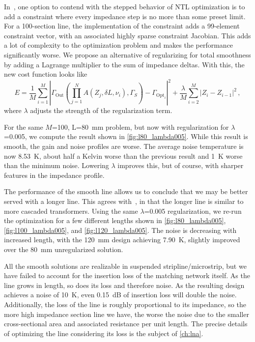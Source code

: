 In~\cite{miazgaNonuniformTransmissionLine2014}, one option to contend with the stepped behavior of NTL optimization is to add a constraint where every impedance step is no more than some preset limit.
For a \num{100}-section line, the implementation of the constraint adds a \num{99}-element constraint vector, with an associated highly sparse constraint Jacobian.
This adds a lot of complexity to the optimization problem and makes the performance significantly worse.
We propose an alternative of regularizing for total smoothness by adding a Lagrange multiplier to the sum of impedance deltas.
With this, the new cost function looks like
%
\begin{equation}
    E = \frac{1}{M}\sum_{i=1}^M \left| \Gamma_\text{Out}\left(\prod_{j=1}^N A(Z_j,\delta L, \nu_i),\Gamma_S\right) - \Gamma_{\text{Opt}_i} \right|^2 + \frac{\lambda}{M} \sum_{i=2}^{M}\left|Z_i-Z_{i-1}\right|^2\,,
    \label{eq:tline_cost_reg}
\end{equation}
%
where $\lambda$ adjusts the strength of the regularization term.

For the same $M$=100, L=\qty{80}{\mm} problem, but now with regularization for $\lambda$=\num{0.005}, we compute the result shown in \autoref{fig:l80_lambda005}.
While this result is smooth, the gain and noise profiles are worse.
The average noise temperature is now \qty{8.53}{\K}, about half a Kelvin worse than the previous result and \qty{1}{\K} worse than the minimum noise.
Lowering $\lambda$ improves this, but of course, with sharper features in the impedance profile.

The performance of the smooth line allows us to conclude that we may be better served with a longer line.
This agrees with~\cite{xiaoImpedanceMatchingComplex2002}, in that the longer line is similar to more cascaded transformers.
Using the same $\lambda$=0.005 regularization, we re-run the optimization for a few different lengths shown in \autoref{fig:l80_lambda005}, \autoref{fig:l100_lambda005}, and \autoref{fig:l120_lambda005}.
The noise is decreasing with increased length, with the \qty{120}{\mm} design achieving \qty{7.90}{\K}, slightly improved over the \qty{80}{\mm} unregularized solution.

All the smooth solutions are realizable in suspended stripline/microstrip, but we have failed to account for the insertion loss of the matching network itself.
As the line grows in length, so does its loss and therefore noise.
As the resulting design achieves a noise of \qty{10}{\K}, even \qty{0.15}{\dB} of insertion loss will double the noise.
Additionally, the loss of the line is roughly proportional to its impedance, so the more high impedance section line we have, the worse the noise due to the smaller cross-sectional area and associated resistance per unit length.
The precise details of optimizing the line considering its loss is the subject of \autoref{ch:lna}.

